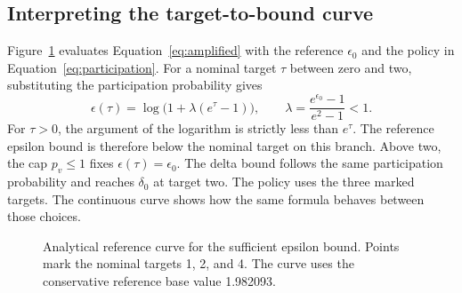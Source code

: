 \subsection{Interpreting the target-to-bound curve}
Figure~\ref{fig:target-bound} evaluates Equation~\eqref{eq:amplified} with the reference $\epsilon_0$ and the policy in Equation~\eqref{eq:participation}. For a nominal target $\tau$ between zero and two, substituting the participation probability gives
\begin{equation}
 \epsilon(\tau)=\log\bigl(1+\lambda(e^\tau-1)\bigr),
 \qquad \lambda=\frac{e^{\epsilon_0}-1}{e^2-1}<1 .
 \label{eq:target-curve}
\end{equation}
For $\tau>0$, the argument of the logarithm is strictly less than $e^\tau$. The reference epsilon bound is therefore below the nominal target on this branch. Above two, the cap $p_v\leq1$ fixes $\epsilon(\tau)=\epsilon_0$. The delta bound follows the same participation probability and reaches $\delta_0$ at target two. The policy uses the three marked targets. The continuous curve shows how the same formula behaves between those choices.

\begin{figure}[htbp]
\centering
{}
\caption[Conditional epsilon bound under the participation policy]{Analytical reference curve for the sufficient epsilon bound. Points mark the nominal targets 1, 2, and 4. The curve uses the conservative reference base value 1.982093.}
\label{fig:target-bound}
\end{figure}

